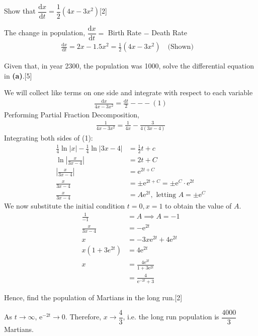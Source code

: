 \documentclass[12pt, a4 paper]{article}
\begin{document}
\begin{outline}[enumerate]
 \2 Show that \(\dfrac{{{\textrm{d}}x}}{{{\textrm{d}}t}} = \dfrac{1}{2}(4x - 3{x^2})\)\hfill[2]
 \begin{answer}
  The change in population, \(\dfrac{{{\textrm{d}}x}}{{{\textrm{d}}t}} =\) Birth Rate \(-\) Death Rate
  \begin{align*}
   \frac{{{\textrm{d}}x}}{{{\textrm{d}}t}} = 2x-1.5x^2 =\frac{1}{2}(4x - 3{x^2}) \quad\textrm{(Shown)}\quad
  \end{align*}
 \end{answer}
 \2 Given that, in year 2300, the population was 1000, solve the differential equation in \textbf{(a)}.\hfill[5]
 \begin{answer}
  We will collect like terms on one side and integrate with respect to each variable
  \begin{align*}
   \frac{\mathrm{d}x}{4x-3x^2} = \frac{\mathrm{d}t}{2} ---(1)
  \end{align*}
  Performing Partial Fraction Decomposition,
  \begin{align*}
   \frac{1}{4x-3x^2} = \frac{1}{4x} - \frac{3}{4(3x-4)}
  \end{align*}
  Integrating both sides of (1):
  \begin{align*}
   \frac{1}{4}\ln{|x|} - \frac{1}{4}\ln{|3x-4|} & = \frac{1}{2}t + c                                                 \\
   \ln{\left|\frac{x}{3x-4}\right|}             & = 2t + C                                                           \\
   \left|\frac{x}{3x-4}\right|                  & = \mathrm{e}^{2t+C}                                                \\
   \frac{x}{3x-4}                               & = \pm \mathrm{e}^{2t+C} = \pm \mathrm{e}^{C} \cdot \mathrm{e}^{2t} \\
   \frac{x}{3x-4}                               & = A\mathrm{e}^{2t},\textrm{ letting } A=\pm\mathrm{e}^{C}
  \end{align*}
  We now substitute the initial condition \(t=0,x=1\) to obtain the value of \(A\).
  \begin{align*}
   \frac{1}{-1}   & = A \implies A=-1                             \\
   \frac{x}{3x-4} & = -\mathrm{e}^{2t}                            \\
   x              & = -3x\mathrm{e}^{2t}+4\mathrm{e}^{2t}         \\
   x(1+3e^{2t})   & = 4\mathrm{e}^{2t}                            \\
   x              & = \frac{4\mathrm{e}^{2t}}{1+3\mathrm{e}^{2t}} \\
                  & = \frac{4}{\mathrm{e}^{-2t}+3}
  \end{align*}
 \end{answer}
 \2 Hence, find the population of Martians in the long run.\hfill[2]
 \begin{answer}
  As \(t \rightarrow \infty \), \(\mathrm{e}^{-2t} \rightarrow 0\). Therefore, \(x \rightarrow \dfrac{4}{3}\), i.e. \;the long run population is \(\dfrac{4000}{3}\) Martians.
 \end{answer}

\end{outline}
\end{document}
